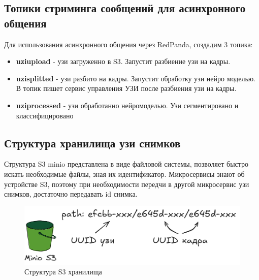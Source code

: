 \subsection{Топики стриминга сообщений для асинхронного общения}
Для использования асинхронного общения через RedPanda, создадим 3 топика:
\begin{itemize}
    \item \textbf{uziupload} - узи загруженно в S3. Запустит разбиение узи на кадры.
    \item \textbf{uzisplitted} - узи разбито на кадры. Запустит обработку узи нейро моделью. В топик пишет сервис управления УЗИ после разбиения узи на кадры.
    \item \textbf{uziprocessed} - узи обработанно нейромоделью. Узи сегментировано и классифицировано
\end{itemize}

\subsection{Структура хранилища узи снимков}
Структура S3 minio представлена в виде файловой системы, позволяет быстро искать необходимые файлы, зная их идентификатор. 
Микросервисы знают об устройстве S3, поэтому при необходимости передчи в другой микросервис узи снимков, достаточно передавать
id снимка.

\begin{figure}[H]%
	\begin{center}
		\includegraphics[width=.6\columnwidth]{./img/s3_arc.png}%
	\end{center}
	\caption{Структура S3 хранилища}%
	\label{pic:auth_model}%
\end{figure}




